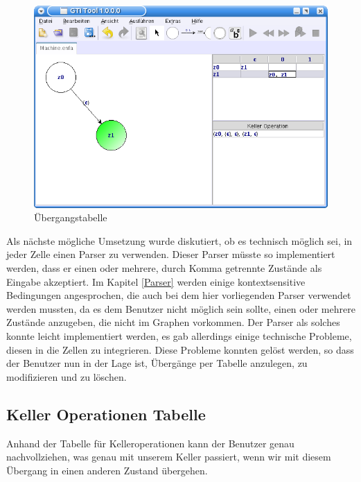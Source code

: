 \begin{figure}[h!]
\begin{center}
\includegraphics[width=12cm]{../images/machine_table.png}
\caption{Übergangstabelle}
\end{center}
\end{figure}
\vspace{10pt}

Als nächste mögliche Umsetzung wurde diskutiert, ob es technisch möglich sei,
in jeder Zelle einen Parser zu verwenden. Dieser Parser müsste so implementiert
werden, dass er einen oder mehrere, durch Komma getrennte Zustände als Eingabe
akzeptiert. Im Kapitel \ref{Parser} werden einige kontextsensitive Bedingungen
angesprochen, die auch bei dem hier vorliegenden Parser verwendet werden
mussten, da es dem Benutzer nicht möglich sein sollte, einen oder mehrere
Zustände anzugeben, die nicht im Graphen vorkommen. Der Parser als solches
konnte leicht implementiert werden, es gab allerdings einige technische
Probleme, diesen in die Zellen zu integrieren. Diese Probleme konnten gelöst
werden, so dass der Benutzer nun in der Lage ist, Übergänge per Tabelle
anzulegen, zu modifizieren und zu löschen.\vspace{10pt}


\subsection{Keller Operationen Tabelle}\label{TablesPDA}

Anhand der Tabelle für Kelleroperationen kann der Benutzer genau
nachvollziehen, was genau mit unserem Keller passiert, wenn wir mit diesem
Übergang in einen anderen Zustand übergehen.\vspace{10pt}

